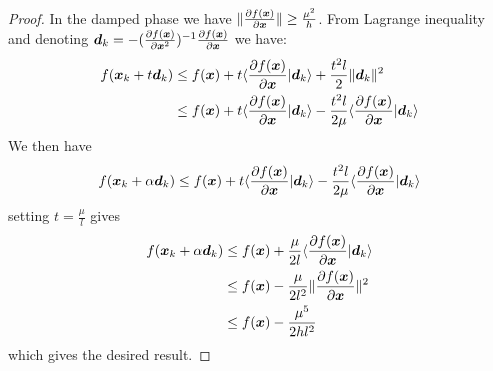  \begin{proof}
   In the damped phase we have  $\| \partialfrac{\xb}{f(\xb)} \| \geq
   \frac{\mu^2}{h}$.
   From Lagrange inequality and denoting $\db_k = -(\partialfrac{\xb^2}{f(\xb)})^{-1} \partialfrac{\xb}{f(\xb)}$ we have:
   \begin{align}
     f(\xb_k + t \db_k) & \leq f(\xb) + t \langle \partialfrac{\xb}{f(\xb)} | \db_k \rangle  +  \frac{t^2 l}{2} \|\db_k\|^2 \\
                        & \leq f(\xb) + t \langle \partialfrac{\xb}{f(\xb)} | \db_k \rangle  -  \frac{t^2 l}{2 \mu} \langle \partialfrac{\xb}{f(\xb)} | \db_k \rangle \\
   \end{align}
   We then have 
   \begin{align}
     &  f(\xb_k + \alpha \db_k)  \leq f(\xb) + t \langle \partialfrac{\xb}{f(\xb)} | \db_k \rangle  -  \frac{t^2 l}{2 \mu} \langle \partialfrac{\xb}{f(\xb)} | \db_k \rangle \\
   \end{align}
   setting $t = \frac{\mu}{l}$ gives
   \begin{align}
       f(\xb_k +\alpha \db_k)  &\leq f(\xb) + \frac{\mu}{2l} \langle \partialfrac{\xb}{f(\xb)} | \db_k \rangle  \\
     &\leq f(\xb) - \frac{\mu}{2l^2} \|\partialfrac{\xb}{f(\xb)}\|^2  \\
     &\leq f(\xb) - \frac{\mu^5}{2h l^2} \\
   \end{align}
   which gives the desired result.


\end{proof}
